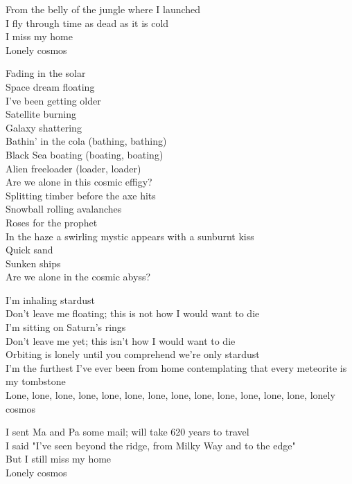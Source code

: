 

From the belly of the jungle where I launched\\
I fly through time as dead as it is cold\\
I miss my home\\
Lonely cosmos\\


Fading in the solar\\
Space dream floating\\
I've been getting older\\
Satellite burning\\
Galaxy shattering\\
Bathin' in the cola (bathing, bathing)\\
Black Sea boating (boating, boating)\\
Alien freeloader (loader, loader)\\
Are we alone in this cosmic effigy?\\

Splitting timber before the axe hits\\
Snowball rolling avalanches\\
Roses for the prophet\\
In the haze a swirling mystic appears with a sunburnt kiss\\
Quick sand\\
Sunken ships\\
Are we alone in the cosmic abyss?\\


I'm inhaling stardust\\
Don't leave me floating; this is not how I would want to die\\
I'm sitting on Saturn's rings\\
Don't leave me yet; this isn't how I would want to die\\
Orbiting is lonely until you comprehend we're only stardust\\
I'm the furthest I've ever been from home contemplating that every meteorite is my tombstone\\
Lone, lone, lone, lone, lone, lone, lone, lone, lone, lone, lone, lone, lone, lonely cosmos\\


I sent Ma and Pa some mail; will take 620 years to travel\\
I said "I've seen beyond the ridge, from Milky Way and to the edge"\\
But I still miss my home\\
Lonely cosmos\\

